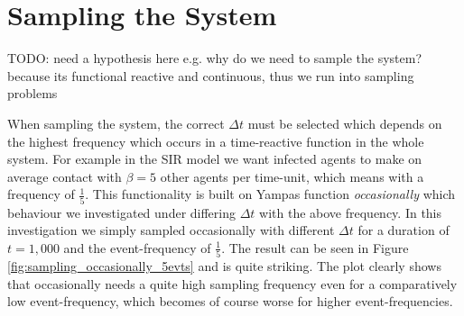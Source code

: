 \section{Sampling the System}
TODO: need a hypothesis here e.g. why do we need to sample the system? because its functional reactive and continuous, thus we run into sampling problems

When sampling the system, the correct $\Delta t$ must be selected which depends on the highest frequency which occurs in a time-reactive function in the whole system. For example in the SIR model we want infected agents to make on average contact with $\beta = 5$ other agents per time-unit, which means with a frequency of $\frac{1}{5}$. This functionality is built on Yampas function \textit{occasionally} which behaviour we investigated under differing $\Delta t$ with the above frequency. In this investigation we simply sampled occasionally with different $\Delta t$ for a duration of $t = 1,000$ and the event-frequency of $\frac{1}{5}$. The result can be seen in Figure \ref{fig:sampling_occasionally_5evts} and is quite striking. The plot clearly shows that occasionally needs a quite high sampling frequency even for a comparatively low event-frequency, which becomes of course worse for higher event-frequencies.

